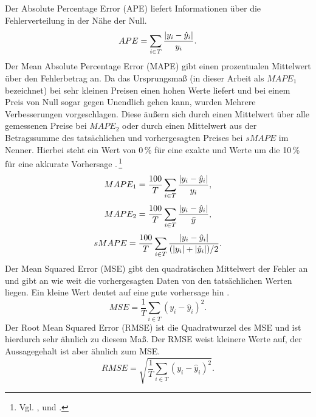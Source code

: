 Der Absolute Percentage Error (\gls{APE}) liefert Informationen über die Fehlerverteilung in der Nähe der Null.\,
%
\begin{equation}
APE= \sum\limits_{i \in T} \frac{\abs{y_i-\hat{y}_i}}{y_i}.
\label{gl:APE}
\end{equation}
%
%
Der Mean Absolute Percentage Error (\gls{MAPE}) gibt einen prozentualen Mittelwert über den Fehlerbetrag an. Da das Ursprungsmaß (in dieser Arbeit als $MAPE_1$ bezeichnet) bei sehr kleinen Preisen einen hohen Werte liefert und bei einem Preis von Null sogar gegen Unendlich gehen kann, wurden Mehrere Verbesserungen vorgeschlagen. Diese äußern sich durch einen Mittelwert über alle gemessenen Preise bei $MAPE_2$ oder durch einen Mittelwert aus der Betragssumme des tatsächlichen und vorhergesagten Preises bei $sMAPE$ im Nenner. Hierbei steht ein Wert von 0\,\% für eine exakte und Werte um die 10\,\% für eine akkurate Vorhersage .\,\footnote{Vgl. \citet[17]{Bobinaite2016}, \citet[2105]{Amjady2009} und \citet[894]{Lago2018}.}   
\begin{equation}
MAPE_1= \frac{100}{T} \sum\limits_{i \in T} \frac{\abs{y_i-\hat{y}_i}}{y_i},
\label{gl:MAPE_1}
\end{equation}
%
\begin{equation}
MAPE_2= \frac{100}{T} \sum\limits_{i \in T} \frac{\abs{y_i-\hat{y}_i}}{\bar{y}},
\label{gl:MAPE_2}
\end{equation}
%
\begin{equation}
sMAPE= \frac{100}{T} \sum\limits_{i \in T} \frac{\abs{y_i-\hat{y}_i}}{(\abs{y_i} + \abs{\hat{y}_i}) / 2}.
\label{gl:sMAPE}
\end{equation}
%
Der Mean Squared Error (\gls{MSE}) gibt den quadratischen Mittelwert der Fehler an und gibt an wie weit die vorhergesagten Daten von den tatsächlichen Werten liegen. Ein kleine Wert deutet auf eine gute vorhersage hin .\,
\begin{equation}
MSE= \frac{1}{T} \sum\limits_{i \in T} (y_i-\hat{y}_i)^2.
\label{gl:MSE}
\end{equation}
%
%
Der Root Mean Squared Error (\gls{RMSE}) ist die Quadratwurzel des MSE und ist hierdurch sehr ähnlich zu diesem Maß. Der RMSE weist kleinere Werte auf, der Aussagegehalt ist aber ähnlich zum MSE.
\begin{equation}
RMSE= \sqrt{ \frac{1}{T} \sum\limits_{i \in T} (y_i-\hat{y}_i)^2}.
\label{gl:RMSE}
\end{equation}
